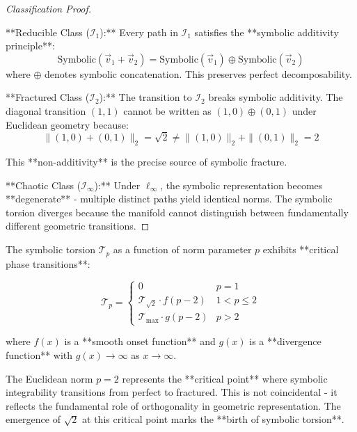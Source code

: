 \begin{proof}[Classification Proof]
\label{proof:bk5_symbolic_integrability_classes}

**Reducible Class ($\mathcal{I}_1$):**
Every path in $\mathcal{I}_1$ satisfies the **symbolic additivity principle**:
$$\text{Symbolic}(\vec{v}_1 + \vec{v}_2) = \text{Symbolic}(\vec{v}_1) \oplus \text{Symbolic}(\vec{v}_2)$$
where $\oplus$ denotes symbolic concatenation. This preserves perfect decomposability.

**Fractured Class ($\mathcal{I}_2$):**
The transition to $\mathcal{I}_2$ breaks symbolic additivity. The diagonal transition $(1,1)$ cannot be written as $(1,0) \oplus (0,1)$ under Euclidean geometry because:
$$\|(1,0) + (0,1)\|_2 = \sqrt{2} \neq \|(1,0)\|_2 + \|(0,1)\|_2 = 2$$

This **non-additivity** is the precise source of symbolic fracture.

**Chaotic Class ($\mathcal{I}_\infty$):**
Under $\ell_\infty$, the symbolic representation becomes **degenerate** - multiple distinct paths yield identical norms. The symbolic torsion diverges because the manifold cannot distinguish between fundamentally different geometric transitions.
\end{proof}


\begin{theorem}
\label{thm:bk5_symbolic_torsion_phase_diagram}
The symbolic torsion $\mathcal{T}_p$ as a function of norm parameter $p$ exhibits **critical phase transitions**:

$$\mathcal{T}_p = \begin{cases}
0 & p = 1 \\
\mathcal{T}_{\sqrt{2}} \cdot f(p-2) & 1 < p \leq 2 \\
\mathcal{T}_{\text{max}} \cdot g(p-2) & p > 2
\end{cases}$$

where $f(x)$ is a **smooth onset function** and $g(x)$ is a **divergence function** with $g(x) \to \infty$ as $x \to \infty$.
\end{theorem}

\begin{scholium}[Critical Point at p=2]
\label{scholium:bk5_critical_point_p2}
The Euclidean norm $p = 2$ represents the **critical point** where symbolic integrability transitions from perfect to fractured. This is not coincidental - it reflects the fundamental role of orthogonality in geometric representation. The emergence of $\sqrt{2}$ at this critical point marks the **birth of symbolic torsion**.
\end{scholium}

